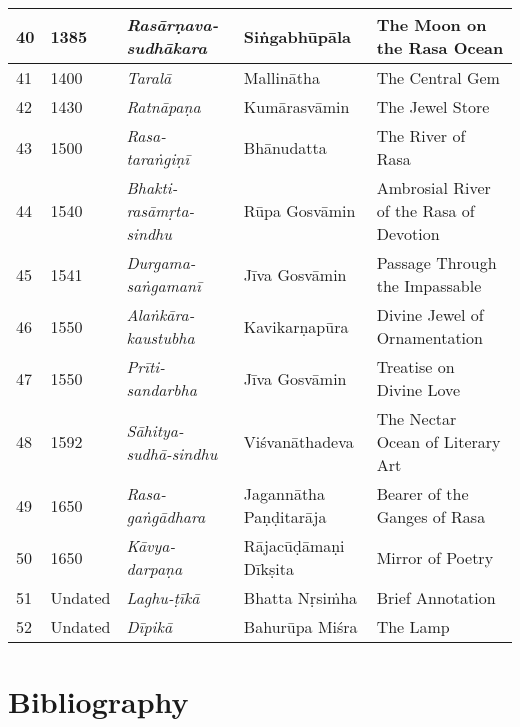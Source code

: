 \begin{longtable}{|l|l|l|l|l|}
\hline
40 & 1385 & \textit{Rasārṇava-sudhākara} & Siṅgabhūpāla & The Moon on the Rasa Ocean \\
\hline
41 & 1400 & \textit{Taralā} & Mallinātha & The Central Gem \\
\hline
42 & 1430 & \textit{Ratnāpaṇa} & Kumārasvāmin & The Jewel Store \\
\hline
43 & 1500 & \textit{Rasa-taraṅgiṇī} & Bhānudatta & The River of Rasa \\
\hline
44 & 1540 & \textit{Bhakti-rasāmṛta-sindhu} & Rūpa Gosvāmin & Ambrosial River of the Rasa of Devotion \\
\hline
45 & 1541 & \textit{Durgama-saṅgamanī} & Jīva Gosvāmin & Passage Through the Impassable \\
\hline
46 & 1550 & \textit{Alaṅkāra-kaustubha} & Kavikarṇapūra & Divine Jewel of Ornamentation \\
\hline
47 & 1550 & \textit{Prīti-sandarbha} & Jīva Gosvāmin & Treatise on Divine Love \\
\hline
48 & 1592 & \textit{Sāhitya-sudhā-sindhu} & Viśvanāthadeva & The Nectar Ocean of Literary Art \\
\hline
49 & 1650 & \textit{Rasa-gaṅgādhara} & Jagannātha Paṇḍitarāja & Bearer of the Ganges of Rasa \\
\hline
50 & 1650 & \textit{Kāvya-darpaṇa} & Rājacūḍāmaṇi Dīkṣita & Mirror of Poetry \\
\hline
51 & Undated & \textit{Laghu-ṭīkā} & Bhatta Nṛsiṁha & Brief Annotation \\
\hline
52 & Undated & \textit{Dīpikā} & Bahurūpa Miśra & The Lamp \\
\hline
\end{longtable}


\section*{Bibliography}

